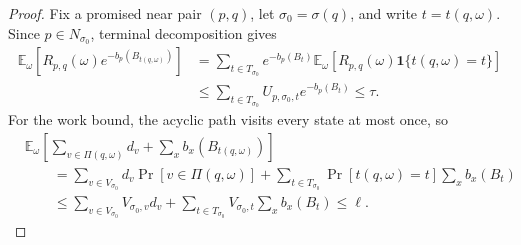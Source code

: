 \documentclass[10pt]{article}
\theoremstyle{definition}
\newcommand{\E}{\mathbb{E}}
\begin{document}
\begin{proof}
   Fix a promised near pair \((p,q)\), let \(\sigma_0=\sigma(q)\), and write
   \(t=t(q,\omega)\).  Since \(p\in N_{\sigma_0}\), terminal decomposition gives
   \[
   \begin{aligned}
      \E_\omega\!\left[
         R_{p,q}(\omega)e^{-b_p(B_{t(q,\omega)})}
      \right]
      &=
      \sum_{t\in T_{\sigma_0}}
      e^{-b_p(B_t)}
      \E_\omega\!\left[
         R_{p,q}(\omega)\mathbf 1\{t(q,\omega)=t\}
      \right]  \\
      &\le
      \sum_{t\in T_{\sigma_0}}
      U_{p,\sigma_0,t}e^{-b_p(B_t)}
      \le\tau .
   \end{aligned}
   \]
   For the work bound, the acyclic path visits every state at most once, so
   \[
   \begin{aligned}
      &\E_\omega\!\left[
         \sum_{v\in\Pi(q,\omega)}d_v
         +\sum_xb_x(B_{t(q,\omega)})
      \right]  \\
      &\qquad=
      \sum_{v\in V_{\sigma_0}}d_v\Pr[v\in\Pi(q,\omega)]
      +
      \sum_{t\in T_{\sigma_0}}
      \Pr[t(q,\omega)=t]\sum_xb_x(B_t)  \\
      &\qquad\le
      \sum_{v\in V_{\sigma_0}}V_{\sigma_0,v}d_v
      +
      \sum_{t\in T_{\sigma_0}}
      V_{\sigma_0,t}\sum_xb_x(B_t)
      \le\ell .
   \end{aligned}
   \]
\end{proof}
\end{document}
